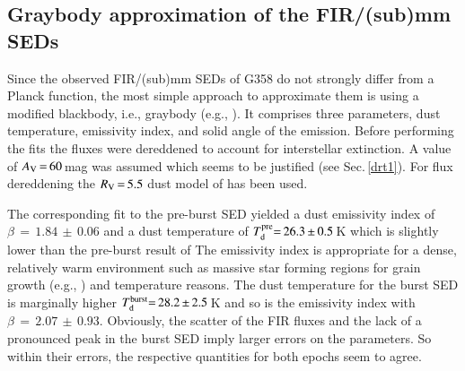 
\subsection{Graybody approximation of the FIR/(sub)mm SEDs}\label{gb}
Since the observed FIR/(sub)mm SEDs of G358 do not strongly differ from a Planck function, the most simple approach to approximate them is using a modified blackbody, i.e., graybody (e.g., \citealp{2016MNRAS.461.1328E}). %
It comprises three parameters, dust temperature, emissivity index, and solid angle of the emission.
Before performing the fits the fluxes were dereddened to account for interstellar extinction. A value of $A_{\rm V}\,{=}\,60$\,mag was assumed which seems to be justified (see Sec.\,\ref{drt1}). For 
flux dereddening 
the $R_{\rm V}\,{=}\,5.5$ dust model of \citet{2003ARA&A..41..241D} has been used.

The corresponding fit to the pre-burst SED yielded  a dust emissivity index of $\beta\,{=}\,1.84\,{\pm}\,0.06$ and a dust temperature of $T_{\rm d}^{\rm pre}{=}\,26.3\,{\pm}\,0.5$\,K which
is slightly lower 
than the pre-burst result of \citet{2019ApJ...881L..39B} 
The emissivity index
is appropriate for a dense, relatively warm environment such as massive star forming regions for grain growth (e.g., \citealp{2005AIPC..761..123L, 2012MNRAS.422.1263H}) and temperature \citep{2005ApJ...633..272B} reasons. The dust temperature for the burst SED is marginally higher $T_{\rm d}^{\rm burst}{=}\,28.2\,{\pm}\,2.5$\,K and so is the emissivity index with $\beta\,{=}\,2.07\,{\pm}\,0.93$. Obviously, the scatter of the FIR fluxes and the lack of a pronounced peak in the burst SED
imply larger errors on the parameters. So within their errors, the respective quantities for both epochs seem to agree.

